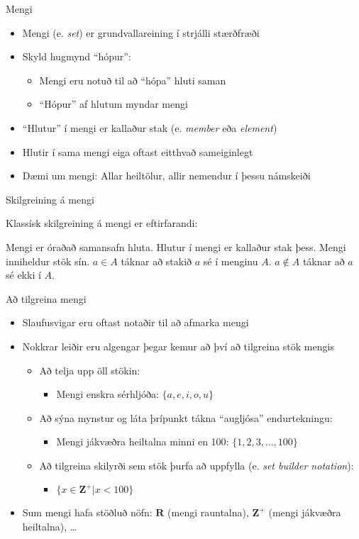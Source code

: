 \documentclass[handout]{beamer}
\begin{document}
\begin{frame}{Mengi}
\begin{itemize}
 \item Mengi (e. \emph{set}) er grundvallareining í strjálli stærðfræði
 \item Skyld hugmynd ``hópur'':
 \begin{itemize}
  \item Mengi eru notuð til að ``hópa'' hluti saman
  \item ``Hópur'' af hlutum myndar mengi
 \end{itemize}
 \item ``Hlutur'' í mengi er kallaður stak (e. \emph{member} eða \emph{element})
 \item Hlutir í sama mengi eiga oftast eitthvað sameiginlegt
 \item Dæmi um mengi: Allar heiltölur, allir nemendur í þessu námskeiði
\end{itemize}
\end{frame}

\begin{frame}{Skilgreining á mengi}

Klassísk skilgreining á mengi er eftirfarandi:
\begin{tcolorbox}[title=Mengi]
Mengi er óraðað samansafn hluta. Hlutur í mengi er kallaður stak þess. Mengi inniheldur stök sín. $a \in A$ táknar að stakið $a$ sé í menginu $A$. $a \notin A$ táknar að $a$ sé ekki í $A$.
\end{tcolorbox}

\end{frame}

\begin{frame}{Að tilgreina mengi}
\begin{itemize}
 \item Slaufusvigar eru oftast notaðir til að afmarka mengi
 \item Nokkrar leiðir eru algengar þegar kemur að því að tilgreina stök mengis
 \begin{itemize}
  \item Að telja upp öll stökin: 
  \begin{itemize}
   \item Mengi enskra sérhljóða: $\{a, e, i, o, u\}$
  \end{itemize}
  \item Að sýna mynstur og láta þrípunkt tákna ``augljósa'' endurtekningu:
  \begin{itemize}
   \item Mengi jákvæðra heiltalna minni en 100: $\{1, 2, 3,\ldots, 100\}$
  \end{itemize}
  \item Að tilgreina skilyrði sem stök þurfa að uppfylla (e. \emph{set builder notation}):
  \begin{itemize}
   \item $\{x \in \mathbf{Z^+} | x < 100\}$
  \end{itemize}
 \end{itemize}
 \item Sum mengi hafa stöðluð nöfn: $\mathbf{R}$ (mengi rauntalna), $\mathbf{Z^+}$ (mengi jákvæðra heiltalna), \ldots
\end{itemize}
\end{frame}
\end{document}
